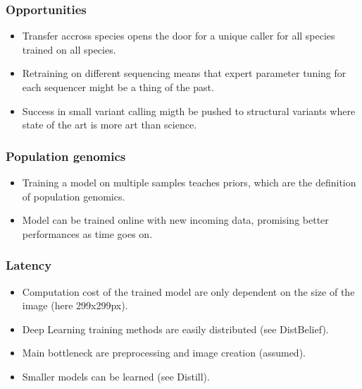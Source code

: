 \documentclass{beamer}
\begin{document}
\begin{frame}
    \frametitle{Opportunities}

    \begin{itemize}
        \item Transfer accross species opens the door for a unique caller for all species trained on
            all species.
        \item Retraining on different sequencing means that expert parameter tuning for each
            sequencer might be a thing of the past.
        \item Success in small variant calling migth be pushed to structural variants where state of
            the art is more art than science.
    \end{itemize}
\end{frame}

\begin{frame}
    \frametitle{Population genomics}

    \begin{itemize}
        \item Training a model on multiple samples teaches priors, which are the definition of
            population genomics.
        \item Model can be trained online with new incoming data, promising better performances as
            time goes on.
    \end{itemize}
\end{frame}

\begin{frame}
    \frametitle{Latency}

    \begin{itemize}
        \item Computation cost of the trained model are only dependent on the size of the image
            (here 299x299px).
        \item Deep Learning training methods are easily distributed (see DistBelief).
        \item Main bottleneck are preprocessing and image creation (assumed).
        \item Smaller models can be learned (see Distill).
    \end{itemize}
\end{frame}
\end{document}
